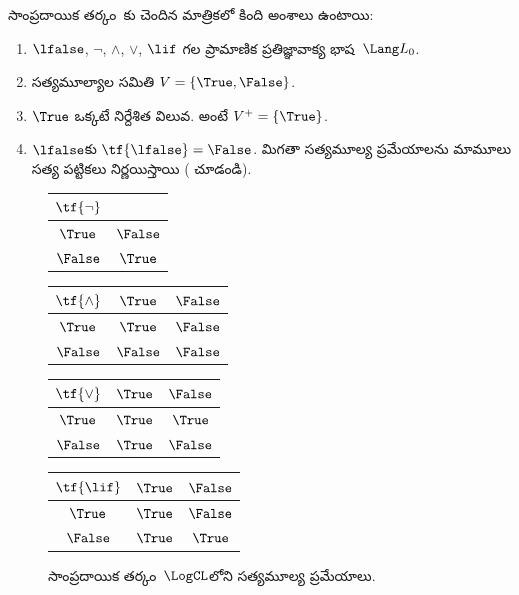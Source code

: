 \documentclass[../../../include/open-logic-section]{subfiles}
\begin{document}
\begin{ex}
సాంప్రదాయిక తర్కం~\LogCL{}కు చెందిన మాత్రికలో కింది అంశాలు ఉంటాయి:
\begin{enumerate}
  \item $\lfalse$, $\lnot$, $\land$, $\lor$, $\lif$ గల
  ప్రామాణిక ప్రతిజ్ఞావాక్య భాష~$\Lang L_0$.
  \item సత్యమూల్యాల సమితి $V = \{\True, \False\}$.
  \item $\True$ ఒక్కటే నిర్దేశిత విలువ. అంటే $V^+ = \{\True\}$.
  \item $\lfalse$కు $\tf{\lfalse} = \False$. మిగతా
సత్యమూల్య ప్రమేయాలను మామూలు సత్య పట్టికలు నిర్ణయిస్తాయి
  ( చూడండి).
\end{enumerate}
\begin{figure}
  \begin{center}
      \begin{tabular}{c|c}
        $\tf{\lnot}$ & \\
        \hline
        $\True$ & $\False$ \\
        $\False$ & $\True$
      \end{tabular}
      \quad
      \begin{tabular}{c|cc}
        $\tf{\land}$ & $\True$ & $\False$ \\
        \hline
        $\True$ & $\True$ & $\False$ \\
        $\False$ & $\False$ & $\False$
      \end{tabular}
      \quad
      \begin{tabular}{c|cc}
        $\tf{\lor}$ & $\True$ & $\False$ \\
        \hline
        $\True$ & $\True$ & $\True$ \\
        $\False$ & $\True$ & $\False$
      \end{tabular}
      \quad
      \begin{tabular}{c|cc}
        $\tf{\lif}$ & $\True$ & $\False$ \\
        \hline
        $\True$ & $\True$ & $\False$ \\
        $\False$ & $\True$ & $\True$
      \end{tabular}
    \end{center}
    \caption{సాంప్రదాయిక తర్కం~$\LogCL$లోని సత్యమూల్య ప్రమేయాలు.}
  \end{figure}
  \end{ex}
\end{document}
